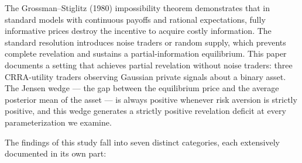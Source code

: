 \documentclass[11pt]{article}
\newcommand{\1}{\mathbf{1}}
\begin{document}
The Grossman--Stiglitz (1980) impossibility theorem demonstrates that in
standard models with continuous payoffs and rational expectations, fully
informative prices destroy the incentive to acquire costly information.
The standard resolution introduces noise traders or random supply, which
prevents complete revelation and sustains a partial-information
equilibrium.  This paper documents a setting that achieves partial
revelation without noise traders: three CRRA-utility traders observing
Gaussian private signals about a binary asset.  The Jensen wedge --- the
gap between the equilibrium price and the average posterior mean of the
asset --- is always positive whenever risk aversion is strictly positive,
and this wedge generates a strictly positive revelation deficit at every
parameterization we examine.

The findings of this study fall into seven distinct categories, each
extensively documented in its own part:
\end{document}

